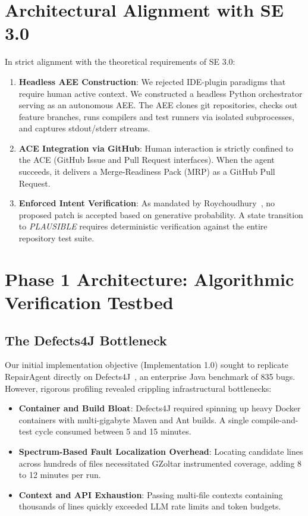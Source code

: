 \documentclass[12pt,a4paper]{report}
\begin{document}
\section{Architectural Alignment with SE 3.0}
In strict alignment with the theoretical requirements of SE 3.0:
\begin{enumerate}
    \item \textbf{Headless AEE Construction}: We rejected IDE-plugin paradigms that require human active context. We constructed a headless Python orchestrator serving as an autonomous AEE. The AEE clones git repositories, checks out feature branches, runs compilers and test runners via isolated subprocesses, and captures stdout/stderr streams.
    \item \textbf{ACE Integration via GitHub}: Human interaction is strictly confined to the ACE (GitHub Issue and Pull Request interfaces). When the agent succeeds, it delivers a Merge-Readiness Pack (MRP) as a GitHub Pull Request.
    \item \textbf{Enforced Intent Verification}: As mandated by Roychoudhury~\cite{roychoudhury2025agentic}, no proposed patch is accepted based on generative probability. A state transition to \textit{PLAUSIBLE} requires deterministic verification against the entire repository test suite.
\end{enumerate}

\section{Phase 1 Architecture: Algorithmic Verification Testbed}

\subsection{The Defects4J Bottleneck}
Our initial implementation objective (Implementation 1.0) sought to replicate RepairAgent directly on Defects4J~\cite{bouzenia2025repairagent}, an enterprise Java benchmark of 835 bugs. However, rigorous profiling revealed crippling infrastructural bottlenecks:
\begin{itemize}
    \item \textbf{Container and Build Bloat}: Defects4J required spinning up heavy Docker containers with multi-gigabyte Maven and Ant builds. A single compile-and-test cycle consumed between 5 and 15 minutes.
    \item \textbf{Spectrum-Based Fault Localization Overhead}: Locating candidate lines across hundreds of files necessitated GZoltar instrumented coverage, adding 8 to 12 minutes per run.
    \item \textbf{Context and API Exhaustion}: Passing multi-file contexts containing thousands of lines quickly exceeded LLM rate limits and token budgets.
\end{itemize}
\end{document}
